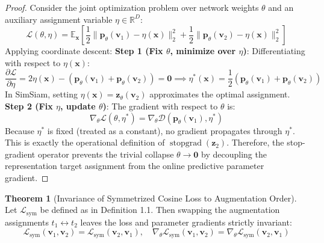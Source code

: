 \documentclass[11pt,a4paper]{article}
\theoremstyle{definition}
\newtheorem{theorem}{\textbf{Theorem}}[section]
\begin{document}
\begin{proof}
Consider the joint optimization problem over network weights $\theta$ and an auxiliary assignment variable $\eta \in \mathbb{R}^D$:
{\boldmath
\begin{equation}
\mathcal{L}(\theta, \eta) = \mathbb{E}_{\mathbf{x}}\left[ \frac{1}{2} \|\mathbf{p}_{\theta}(\mathbf{v}_1) - \eta(\mathbf{x})\|_2^2 + \frac{1}{2} \|\mathbf{p}_{\theta}(\mathbf{v}_2) - \eta(\mathbf{x})\|_2^2 \right]
\end{equation}
}
Applying coordinate descent:
\textbf{Step 1 (Fix $\theta$, minimize over $\eta$)}: Differentiating with respect to $\eta(\mathbf{x})$:
{\boldmath
\begin{equation}
\frac{\partial \mathcal{L}}{\partial \eta} = 2\eta(\mathbf{x}) - (\mathbf{p}_\theta(\mathbf{v}_1) + \mathbf{p}_\theta(\mathbf{v}_2)) = \mathbf{0} \implies \eta^*(\mathbf{x}) = \frac{1}{2} \left( \mathbf{p}_\theta(\mathbf{v}_1) + \mathbf{p}_\theta(\mathbf{v}_2) \right)
\end{equation}
}
In SimSiam, setting $\eta(\mathbf{x}) = \mathbf{z}_\theta(\mathbf{v}_2)$ approximates the optimal assignment.
\textbf{Step 2 (Fix $\eta$, update $\theta$)}: The gradient with respect to $\theta$ is:
{\boldmath
\begin{equation}
\nabla_\theta \mathcal{L}(\theta, \eta^*) = \nabla_\theta \mathcal{D}(\mathbf{p}_\theta(\mathbf{v}_1), \eta^*)
\end{equation}
}
Because $\eta^*$ is fixed (treated as a constant), no gradient propagates through $\eta^*$. This is exactly the operational definition of $\operatorname{stopgrad}(\mathbf{z}_2)$.
Therefore, the stop-gradient operator prevents the trivial collapse $\theta \to \mathbf{0}$ by decoupling the representation target assignment from the online predictive parameter gradient.
\end{proof}

\begin{theorem}[Invariance of Symmetrized Cosine Loss to Augmentation Order]
Let $\mathcal{L}_{\text{sym}}$ be defined as in Definition 1.1. Then swapping the augmentation assignments $t_1 \leftrightarrow t_2$ leaves the loss and parameter gradients strictly invariant:
{\boldmath
\begin{equation}
\mathcal{L}_{\text{sym}}(\mathbf{v}_1, \mathbf{v}_2) = \mathcal{L}_{\text{sym}}(\mathbf{v}_2, \mathbf{v}_1), \quad \nabla_\theta \mathcal{L}_{\text{sym}}(\mathbf{v}_1, \mathbf{v}_2) = \nabla_\theta \mathcal{L}_{\text{sym}}(\mathbf{v}_2, \mathbf{v}_1)
\end{equation}
}
\end{theorem}
\end{document}
